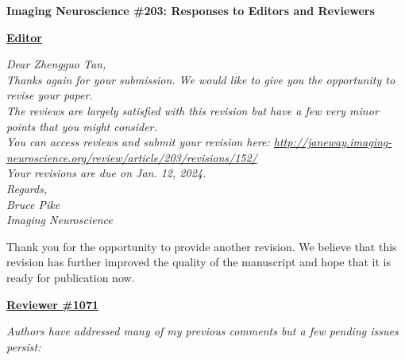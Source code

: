 \documentclass[a4paper,11pt,twoside]{report}
\begin{document}
\begin{center}
	{\large\textbf{Imaging Neuroscience \#203: Responses to Editors and Reviewers}}
\end{center}


\noindent \underline{\textbf{Editor}}

\noindent \textit{Dear Zhengguo Tan,\\
\newline
Thanks again for your submission. We would like to give you the opportunity to revise your paper.\\
\newline
The reviews are largely satisfied with this revision but have a few very minor points that you might consider.\\
\newline
You can access reviews and submit your revision here: \url{http://janeway.imaging-neuroscience.org/review/article/203/revisions/152/}\\
\newline
Your revisions are due on Jan. 12, 2024.\\
\newline
Regards,\\
Bruce Pike\\
\newline
Imaging Neuroscience}

{\color{blue} Thank you for the opportunity
to provide another revision.
We believe that this revision has further improved the quality
of the manuscript and hope that it is ready for publication now.}

\vspace{2em}

\noindent \underline{\textbf{Reviewer \#1071}}

\textit{Authors have addressed many of my previous comments but a few pending issues persist:}
\end{document}
